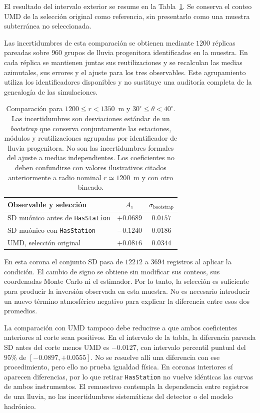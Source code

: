 El resultado del intervalo exterior se resume en la Tabla~\ref{tab:infill2026_comparacion}. Se conserva el conteo UMD de la selección original como referencia, sin presentarlo como una muestra subterránea no seleccionada.

Las incertidumbres de esta comparación se obtienen mediante $1200$ réplicas
pareadas sobre $960$ grupos de lluvia progenitora identificados en la muestra.
En cada réplica se mantienen juntas sus reutilizaciones y se recalculan las
medias azimutales, sus errores y el ajuste para los tres observables. Este
agrupamiento utiliza los identificadores disponibles y no sustituye una
auditoría completa de la genealogía de las simulaciones.

\begin{table}[H]
\centering
\begin{tabular}{lcc}
\toprule
Observable y selección & $A_1$ & $\sigma_{\mathrm{bootstrap}}$\\
\midrule
SD muónico antes de \texttt{HasStation} & $+0.0689$ & $0.0157$\\
SD muónico con \texttt{HasStation} & $-0.1240$ & $0.0186$\\
UMD, selección original & $+0.0816$ & $0.0344$\\
\bottomrule
\end{tabular}
\caption{Comparación para $1200\leq r<1350$~m y $30^\circ\leq\theta<40^\circ$. Las incertidumbres son desviaciones estándar de un \textit{bootstrap} que conserva conjuntamente las estaciones, módulos y reutilizaciones agrupadas por identificador de lluvia progenitora. No son las incertidumbres formales del ajuste a medias independientes. Los coeficientes no deben confundirse con valores ilustrativos citados anteriormente a radio nominal $r\simeq1200$~m y con otro bineado.}
\label{tab:infill2026_comparacion}
\end{table}

En esta corona el conjunto SD pasa de $12212$ a $3694$ registros al aplicar la condición. El cambio de signo se obtiene sin modificar sus conteos, sus coordenadas Monte Carlo ni el estimador. Por lo tanto, la selección es suficiente para producir la inversión observada en esta muestra. No es necesario introducir un nuevo término atmosférico negativo para explicar la diferencia entre esos dos promedios.

La comparación con UMD tampoco debe reducirse a que ambos coeficientes anteriores al corte sean positivos. En el intervalo de la tabla, la diferencia pareada SD antes del corte menos UMD es $-0.0127$, con intervalo percentil puntual del $95\%$ de $[-0.0897,+0.0555]$. No se resuelve allí una diferencia con ese procedimiento, pero ello no prueba igualdad física. En coronas interiores sí aparecen diferencias, por lo que retirar \texttt{HasStation} no vuelve idénticas las curvas de ambos instrumentos. El remuestreo contempla la dependencia entre registros de una lluvia, no las incertidumbres sistemáticas del detector o del modelo hadrónico.

